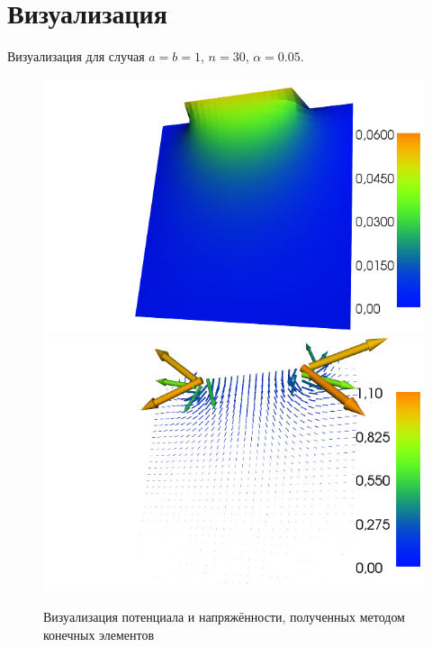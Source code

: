 \documentclass{report}
\begin{document}
\section{Визуализация}
Визуализация для случая $a=b=1$, $n=30$, $\alpha = 0.05$.
\begin{figure}[t]
	\includegraphics[scale=0.4]{dolfin_plot_0.png}
	\includegraphics[scale=0.4]{dolfin_plot_1.png}
	\caption{Визуализация потенциала и напряжённости, полученных методом конечных элементов}
	\centering
\end{figure}
\end{document}
